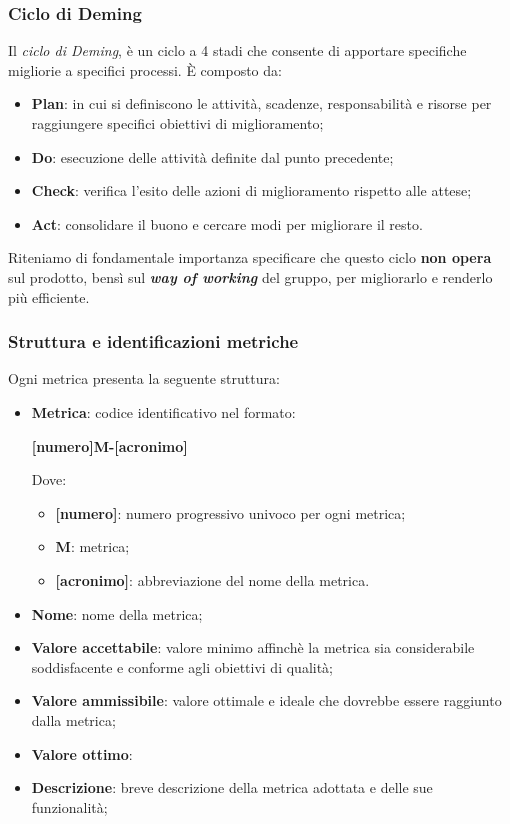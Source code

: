 \subsubsection{Ciclo di Deming}
Il \textit{ciclo di Deming}, è un ciclo a 4 stadi che consente di apportare specifiche migliorie a specifici processi. È composto da:
\begin{itemize}
	\item \textbf{Plan}: in cui si definiscono le attività, scadenze, responsabilità e risorse per raggiungere specifici obiettivi di miglioramento;
	\item \textbf{Do}: esecuzione delle attività definite dal punto precedente;
	\item \textbf{Check}: verifica l'esito delle azioni di miglioramento rispetto alle attese;
	\item \textbf{Act}: consolidare il buono e cercare modi per migliorare il resto.
\end{itemize}
Riteniamo di fondamentale importanza specificare che questo ciclo \textbf{non opera} sul prodotto, bensì sul \textbf{\textit{way of working}} del gruppo, per migliorarlo e renderlo più efficiente.

\subsubsection{Struttura e identificazioni metriche}
Ogni metrica presenta la seguente struttura:
\begin{itemize}
	\item \textbf{Metrica}:
	      codice identificativo nel formato:
	      \begin{center}
		      \textbf{[numero]M-[acronimo]}
	      \end{center}
	      Dove:
	      \begin{itemize}
		      \item \textbf{[numero]}: numero progressivo univoco per ogni metrica;
		      \item \textbf{M}: metrica;
		      \item \textbf{[acronimo]}: abbreviazione del nome della metrica.
	      \end{itemize}
	\item \textbf{Nome}: nome della metrica;
	\item \textbf{Valore accettabile}: valore minimo affinchè la metrica sia considerabile soddisfacente e conforme agli obiettivi di qualità;
	\item \textbf{Valore ammissibile}: valore ottimale e ideale che dovrebbe essere raggiunto dalla metrica;
	\item \textbf{Valore ottimo}:
	\item \textbf{Descrizione}: breve descrizione della metrica adottata e delle sue funzionalità;
\end{itemize}

